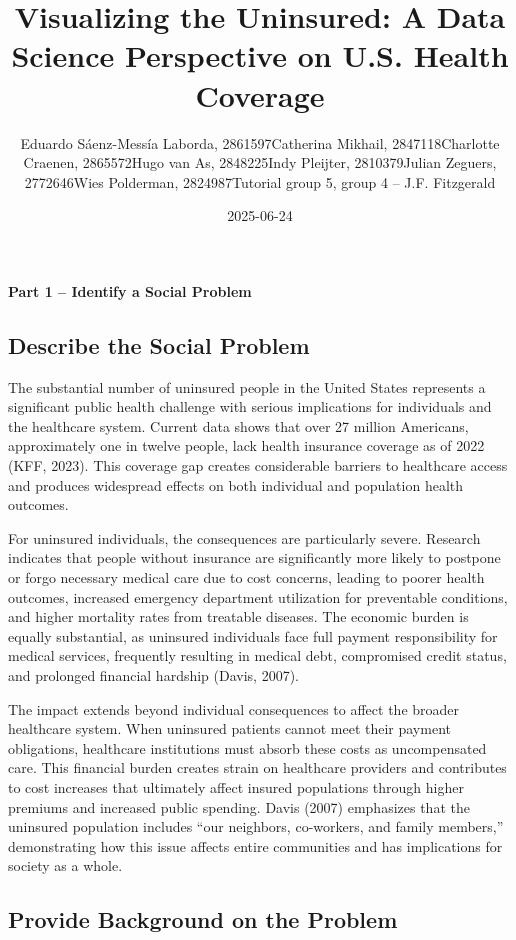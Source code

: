 \documentclass[
]{article}
\title{Visualizing the Uninsured: A Data Science Perspective on U.S.
Health Coverage}
\author{\begin{itemize}
\tightlist
\item
  Eduardo Sáenz-Messía Laborda, 2861597
\item
  Catherina Mikhail, 2847118
\item
  Charlotte Craenen, 2865572
\item
  Hugo van As, 2848225
\item
  Indy Pleijter, 2810379
\item
  Julian Zeguers, 2772646
\item
  Wies Polderman, 2824987
\item
  Tutorial group 5, group 4 -- J.F. Fitzgerald
\end{itemize}}
\date{2025-06-24}
\begin{document}
\maketitle

{
\setcounter{tocdepth}{2}
\tableofcontents
}
\textbf{Part 1 -- Identify a Social Problem}

\subsection{Describe the Social
Problem}\label{describe-the-social-problem}

The substantial number of uninsured people in the United States
represents a significant public health challenge with serious
implications for individuals and the healthcare system. Current data
shows that over 27 million Americans, approximately one in twelve
people, lack health insurance coverage as of 2022 (KFF, 2023). This
coverage gap creates considerable barriers to healthcare access and
produces widespread effects on both individual and population health
outcomes.

For uninsured individuals, the consequences are particularly severe.
Research indicates that people without insurance are significantly more
likely to postpone or forgo necessary medical care due to cost concerns,
leading to poorer health outcomes, increased emergency department
utilization for preventable conditions, and higher mortality rates from
treatable diseases. The economic burden is equally substantial, as
uninsured individuals face full payment responsibility for medical
services, frequently resulting in medical debt, compromised credit
status, and prolonged financial hardship (Davis, 2007).

The impact extends beyond individual consequences to affect the broader
healthcare system. When uninsured patients cannot meet their payment
obligations, healthcare institutions must absorb these costs as
uncompensated care. This financial burden creates strain on healthcare
providers and contributes to cost increases that ultimately affect
insured populations through higher premiums and increased public
spending. Davis (2007) emphasizes that the uninsured population includes
``our neighbors, co-workers, and family members,'' demonstrating how
this issue affects entire communities and has implications for society
as a whole.

\subsection{Provide Background on the
Problem}\label{provide-background-on-the-problem}
\end{document}
